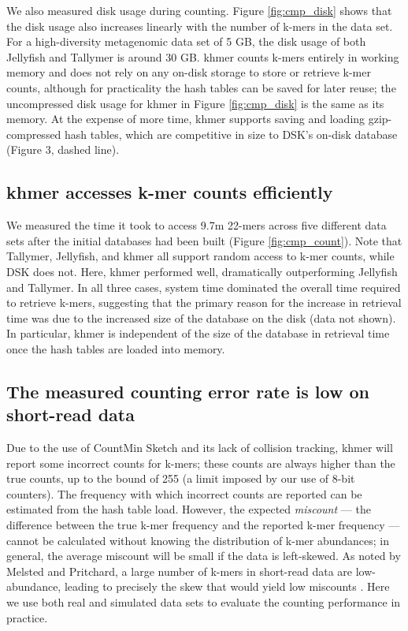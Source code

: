 \documentclass[10pt]{article}
\begin{document}
We also measured disk usage during counting.
Figure \ref{fig:cmp_disk} shows that
the disk usage also increases linearly with the number of k-mers in the
data set.
For a high-diversity metagenomic
data set of 5 GB, the disk usage of both Jellyfish and Tallymer is
around 30 GB.  khmer counts k-mers entirely in working memory and does
not rely on any on-disk storage to store or retrieve k-mer counts,
although for practicality the hash tables can be saved for later
reuse; the uncompressed disk usage for khmer in Figure \ref{fig:cmp_disk}
is the same as its memory.  At the expense of more time, khmer
supports saving and loading gzip-compressed hash tables, which are
competitive in size to DSK's on-disk database (Figure 3, dashed line).

\subsection*{khmer accesses k-mer counts efficiently}

We measured the time it took to access 9.7m 22-mers across five
different data sets after the initial databases had been built (Figure
\ref{fig:cmp_count}).  Note that Tallymer, Jellyfish, and khmer all
support random access to k-mer counts, while DSK does not. Here, khmer
performed well, dramatically outperforming Jellyfish and Tallymer.  In
all three cases, system time dominated the overall time required to
retrieve k-mers, suggesting that the primary reason for the
increase in retrieval time was due to the increased size of the
database on the disk (data not shown).  In particular, khmer is
independent of the size of the database in retrieval time once the
hash tables are loaded into memory.

\subsection*{The measured counting error rate is low on short-read data}

Due to the use of CountMin Sketch and its lack of collision tracking,
khmer will report some incorrect counts for k-mers; these counts are
always higher than the true counts, up to the bound of 255 (a limit imposed
by our use of 8-bit counters). The frequency with which 
 incorrect counts are reported can be estimated from the hash table
load.  However, the expected {\em miscount} --- the difference
between the true k-mer frequency and the reported k-mer frequency --- cannot be
calculated without knowing the distribution of k-mer abundances; in
general, the average miscount will be small if the data is
left-skewed.  As noted by Melsted and Pritchard, a large number of k-mers in
short-read data are low-abundance, leading to precisely the skew
that would yield low miscounts \cite{Melsted2011}.  Here we use both
real and simulated data sets to evaluate the counting performance in
practice.
\end{document}

